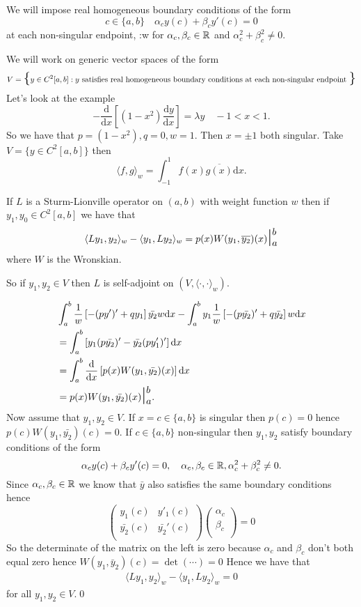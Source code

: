 \documentclass{article}
\begin{document}
We will impose real homogeneous boundary conditions of the form
\[
	c\in \{a,b\}\quad \alpha_cy(c)+\beta_cy'(c)=0
\]
at each non-singular endpoint, :w
for $ \alpha_c,\beta_c\in \mathbb{R} $ and $ \alpha_c^2+\beta_c^2\ne 0 $.\par
We will work on generic vector spaces of the form
\[
	V=\mathhuge{\{}
	  y\in C^2[a,b]: y \text{ satisfies real homogeneous boundary conditions at each non-singular endpoint }
  \mathhuge{\}}
\]
Let's look at the example
\[
	-\frac{\mathrm d}{\mathrm dx}\left[(1-x^2)\frac{\mathrm dy}{\mathrm dx}\right]=\lambda y\quad -1<x< 1.
\]
So we have that $ p=(1-x^2),q=0,w=1 $. Then $ x=\pm 1 $ both singular. Take $ V=\{y\in C^2[a,b]\} $ then
\[
	\langle f,g\rangle_w=\int_{-1}^1f(x)\overline{g(x)}\mathrm dx.
\]
\begin{proposition}
	If $ L $ is a Sturm-Lionville operator on $ (a,b)  $ with weight function $ w $ then if $ y_1,y_0\in C^2[a,b] $ we have that 
	\[
		\langle Ly_1,y_2\rangle_w-\langle y_1,Ly_2\rangle_w=p(x)W(y_1,\overline{y_2})(x)\mathhuge{|}^b_a
	\]
	where $ W $ is the Wronskian.
\end{proposition}
So if $ y_1,y_2\in V $ then $ L $ is self-adjoint on $ (V,\langle\cdot,\cdot\rangle_w) $.\par
\pf
\begin{align*}
	&\int_a^b\frac 1w\left[-(py')'+qy_1\right]\bar{y_2}w\mathrm dx-\int_a^by_1\frac 1w\left[-(p\bar{y_2})'+q\bar{y_2}\right]w\mathrm dx\\
&= \int_a^b\left[y_1(p\bar{y_2})'-\bar{y_2}(py'_1)'\right]\mathrm dx\\
	&= \int_a^b\frac{\mathrm d}{\mathrm dx}\left[p(x)W(y_1,\bar{y_2})(x)\right]\mathrm dx\\
	&= p(x)W(y_1,\bar{y_2})(x)\mathhuge{|}_a^b.
\end{align*}
Now assume that $ y_1,y_2\in V $. If $ x=c \in \{a,b\} $ is singular then $ p(c)=0 $ hence $ p(c)W(y_1,\bar {y_2})(c)=0 $. If $ c\in \{a,b\} $ non-singular then $ y_1,y_2 $ satisfy boundary conditions of the form
\[
  \alpha_cy(c)+\beta_cy'(c)=0,\quad \alpha_c,\beta_c\in \mathbb{R}, \alpha_c^2+\beta_c^2\ne 0.
\]
Since $ \alpha_c,\beta_c\in \mathbb{R} $ we know that $ \bar y $ also satisfies the same boundary conditions hence
\[
  \begin{pmatrix}
	  y_1(c) & y'_1(c) \\
	  \bar{y_2}(c) & \bar{y_2}'(c) \\
  \end{pmatrix}
  \begin{pmatrix}
    \alpha_c \\
    \beta_c \\
  \end{pmatrix}
  =0
\]
So the determinate of the matrix on the left is zero because $ \alpha_c $ and $ \beta_c $ don't both equal zero hence $ W(y_1,\bar y_2)(c) = \det(\cdots)=0 $ Hence we have that
 \begin{align*}
   \langle Ly_1,y_2\rangle_w-\langle y_1,Ly_2\rangle_w=0
 \end{align*}
 for all $ y_1,y_2\in V $.\qed
\end{document}
